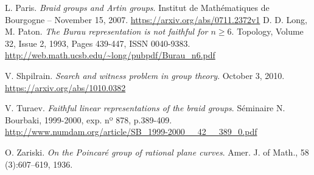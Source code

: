 \documentclass[TFG.tex]{subfiles}
\begin{document}
\begin{thebibliography}{}
 L. Paris. \textit{Braid groups and Artin groups}. Institut de Mathématiques de Bourgogne – November 15, 2007. \url{https://arxiv.org/abs/0711.2372v1}
D. D. Long, M. Paton.
\emph{The Burau representation is not faithful for $n ≥ 6$}.
Topology,
Volume 32, Issue 2,
1993,
Pages 439-447,
ISSN 0040-9383. \url{http://web.math.ucsb.edu/~long/pubpdf/Burau_n6.pdf}

 V. Shpilrain. \emph{Search and witness problem in group theory}. October 3, 2010. \url{https://arxiv.org/abs/1010.0382}

 V. Turaev. \emph{Faithful linear representations of the braid groups}. Séminaire N. Bourbaki, 1999-2000, exp. nº 878, p.389-409. \url{http://www.numdam.org/article/SB_1999-2000__42__389_0.pdf}

 O. Zariski. \emph{On the Poincaré group of rational plane curves}. Amer. J.
of Math., 58 (3):607–619, 1936.



















\end{thebibliography}
\end{document}
